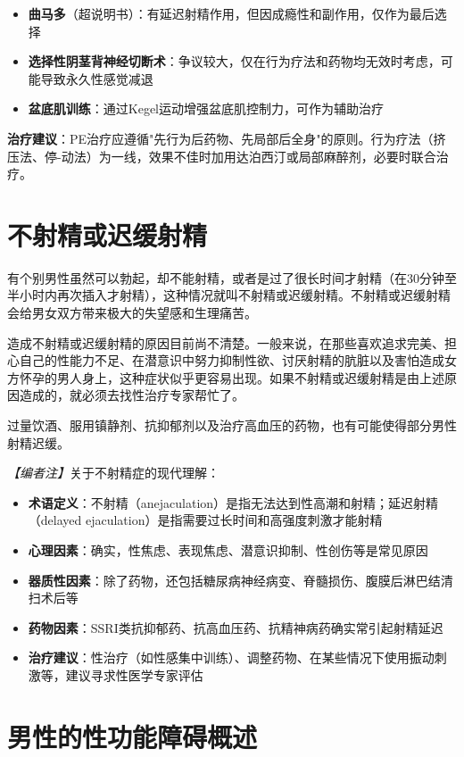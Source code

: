 \begin{itemize}[leftmargin=2cm]
	\item \textbf{曲马多}（超说明书）：有延迟射精作用，但因成瘾性和副作用，仅作为最后选择
	\item \textbf{选择性阴茎背神经切断术}：争议较大，仅在行为疗法和药物均无效时考虑，可能导致永久性感觉减退
	\item \textbf{盆底肌训练}：通过Kegel运动增强盆底肌控制力，可作为辅助治疗
\end{itemize}

\textbf{治疗建议}：PE治疗应遵循"先行为后药物、先局部后全身"的原则。行为疗法（挤压法、停-动法）为一线，效果不佳时加用达泊西汀或局部麻醉剂，必要时联合治疗。

\section{不射精或迟缓射精}

有个别男性虽然可以勃起，却不能射精，或者是过了很长时间才射精（在30分钟至半小时内再次插入才射精），这种情况就叫不射精或迟缓射精。不射精或迟缓射精会给男女双方带来极大的失望感和生理痛苦。

造成不射精或迟缓射精的原因目前尚不清楚。一般来说，在那些喜欢追求完美、担心自己的性能力不足、在潜意识中努力抑制性欲、讨厌射精的肮脏以及害怕造成女方怀孕的男人身上，这种症状似乎更容易出现。如果不射精或迟缓射精是由上述原因造成的，就必须去找性治疗专家帮忙了。

过量饮酒、服用镇静剂、抗抑郁剂以及治疗高血压的药物，也有可能使得部分男性射精迟缓。

\noindent\textit{【编者注】}关于不射精症的现代理解：
\begin{itemize}
	\item \textbf{术语定义}：不射精（anejaculation）是指无法达到性高潮和射精；延迟射精（delayed ejaculation）是指需要过长时间和高强度刺激才能射精
	\item \textbf{心理因素}：确实，性焦虑、表现焦虑、潜意识抑制、性创伤等是常见原因
	\item \textbf{器质性因素}：除了药物，还包括糖尿病神经病变、脊髓损伤、腹膜后淋巴结清扫术后等
	\item \textbf{药物因素}：SSRI类抗抑郁药、抗高血压药、抗精神病药确实常引起射精延迟
	\item \textbf{治疗建议}：性治疗（如性感集中训练）、调整药物、在某些情况下使用振动刺激等，建议寻求性医学专家评估
\end{itemize}

\section{男性的性功能障碍概述}

